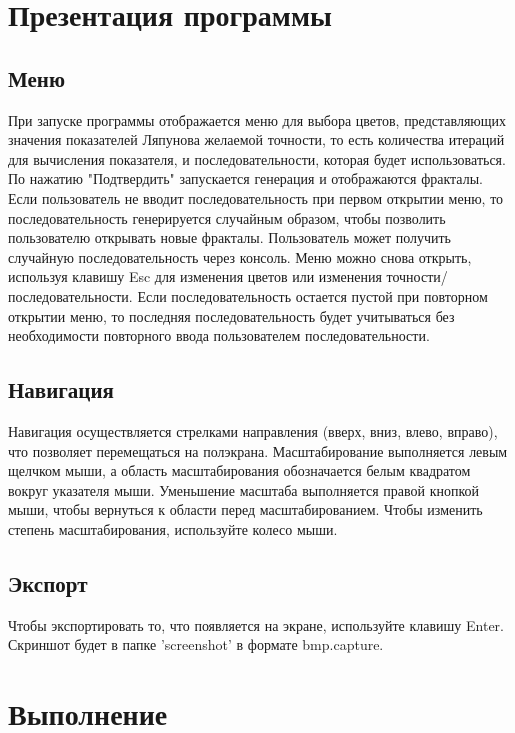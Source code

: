 \documentclass[a5paper,10pt, twoside]{article} %
\begin{document}
\section{Презентация программы}

  \subsection{Меню}

  При запуске программы отображается меню для выбора цветов, представляющих значения показателей Ляпунова
  желаемой точности, то есть количества итераций для вычисления показателя, и последовательности, которая будет использоваться.
  По нажатию "Подтвердить" запускается генерация и отображаются фракталы.
  Если пользователь не вводит последовательность при первом открытии меню, то последовательность генерируется случайным образом, 
  чтобы позволить пользователю открывать новые фракталы.
  Пользователь может получить случайную последовательность через консоль.
  Меню можно снова открыть, используя клавишу Esc для изменения цветов или изменения точности/последовательности.
  Если последовательность остается пустой при повторном открытии меню, то последняя последовательность будет учитываться 
  без необходимости повторного ввода пользователем последовательности.

  \subsection{Навигация}

  Навигация осуществляется стрелками направления (вверх, вниз, влево, вправо), что позволяет перемещаться на полэкрана.
  Масштабирование выполняется левым щелчком мыши, а область масштабирования обозначается белым квадратом вокруг указателя мыши.
  Уменьшение масштаба выполняется правой кнопкой мыши, чтобы вернуться к области перед масштабированием.
  Чтобы изменить степень масштабирования, используйте колесо мыши.

  \subsection{Экспорт}

  Чтобы экспортировать то, что появляется на экране, используйте клавишу Enter.
  Скриншот будет в папке 'screenshot' в формате bmp.capture.

\section{Выполнение}
  
\end{document}
